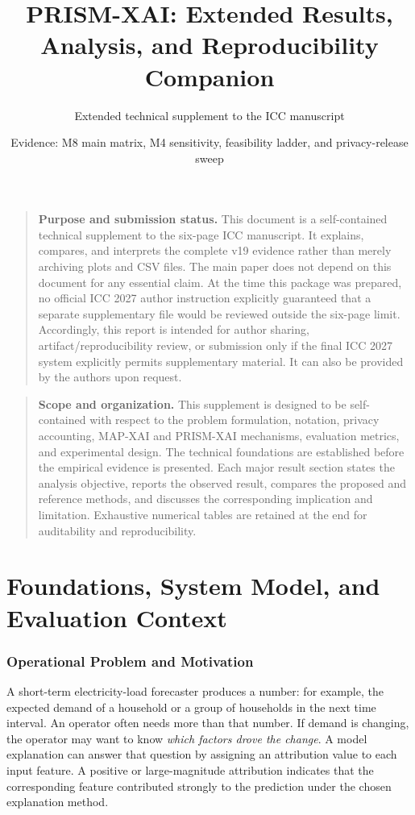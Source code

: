 \documentclass[11pt]{article}
\title{PRISM-XAI: Extended Results, Analysis, and Reproducibility Companion}
\author{Extended technical supplement to the ICC manuscript}
\date{Evidence: M8 main matrix, M4 sensitivity, feasibility ladder, and privacy-release sweep}
\begin{document}
\maketitle

\begin{quote}\small
\textbf{Purpose and submission status.} This document is a self-contained technical supplement to the six-page ICC manuscript. It explains, compares, and interprets the complete v19 evidence rather than merely archiving plots and CSV files. The main paper does not depend on this document for any essential claim. At the time this package was prepared, no official ICC 2027 author instruction explicitly guaranteed that a separate supplementary file would be reviewed outside the six-page limit. Accordingly, this report is intended for author sharing, artifact/reproducibility review, or submission only if the final ICC 2027 system explicitly permits supplementary material. It can also be provided by the authors upon request.
\end{quote}


\tableofcontents
\clearpage

\begin{quote}\small
\textbf{Scope and organization.}
This supplement is designed to be self-contained with respect to the problem formulation, notation, privacy accounting, MAP-XAI and PRISM-XAI mechanisms, evaluation metrics, and experimental design. The technical foundations are established before the empirical evidence is presented. Each major result section states the analysis objective, reports the observed result, compares the proposed and reference methods, and discusses the corresponding implication and limitation. Exhaustive numerical tables are retained at the end for auditability and reproducibility.
\end{quote}

\part{Foundations, System Model, and Evaluation Context}

\section{Operational Problem and Motivation}
A short-term electricity-load forecaster produces a number: for example, the expected demand of a household or a group of households in the next time interval. An operator often needs more than that number. If demand is changing, the operator may want to know \emph{which factors drove the change}. A model explanation can answer that question by assigning an attribution value to each input feature. A positive or large-magnitude attribution indicates that the corresponding feature contributed strongly to the prediction under the chosen explanation method.
\end{document}
